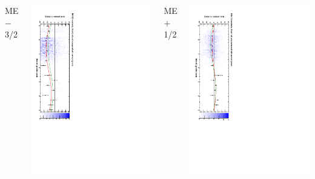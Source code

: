 \documentclass[compress]{beamer}
\begin{document}
\begin{frame}
\begin{columns}
ME$-$3/2

\includegraphics[height=\linewidth, angle=90]{datacsc_survey_mem32.pdf}


ME$+$1/2

\includegraphics[height=\linewidth, angle=90]{datacsc_survey_mep12.pdf}


\end{columns}
\end{frame}
\end{document}
